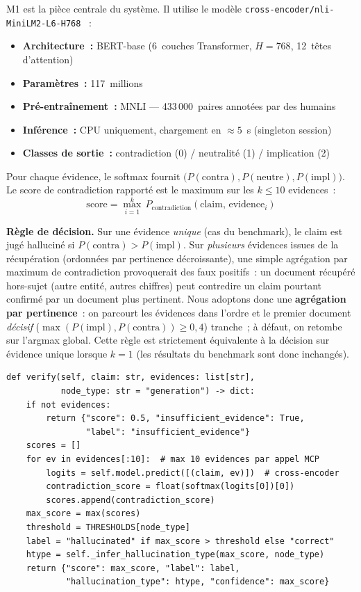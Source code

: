 \documentclass[12pt,a4paper]{article}
\begin{document}
M1 est la pièce centrale du système. Il utilise le modèle \texttt{cross-encoder/nli-MiniLM2-L6-H768} \cite{reimers2019sbert}~:

\begin{itemize}[noitemsep]
  \item \textbf{Architecture~:} BERT-base (6~couches Transformer, $H=768$, 12~têtes d'attention)
  \item \textbf{Paramètres~:} 117~millions
  \item \textbf{Pré-entraînement~:} MNLI \cite{williams2018mnli} --- 433\,000~paires annotées par des humains
  \item \textbf{Inférence~:} CPU uniquement, chargement en $\approx 5$~s (singleton session)
  \item \textbf{Classes de sortie~:} contradiction (0) / neutralité (1) / implication (2)
\end{itemize}

Pour chaque évidence, le softmax fournit $\bigl(P(\text{contra}), P(\text{neutre}), P(\text{impl})\bigr)$. Le score de contradiction rapporté est le maximum sur les $k \leq 10$ evidences~:
\begin{equation}
\text{score} = \max_{i=1}^{k} \,P_{\text{contradiction}}(\text{claim},\,\text{evidence}_i)
\label{eq:max_score}
\end{equation}

\textbf{Règle de décision.} Sur une évidence \emph{unique} (cas du benchmark), le claim est jugé halluciné si $P(\text{contra}) > P(\text{impl})$. Sur \emph{plusieurs} évidences issues de la récupération (ordonnées par pertinence décroissante), une simple agrégation par maximum de contradiction provoquerait des faux positifs~: un document récupéré hors-sujet (autre entité, autres chiffres) peut contredire un claim pourtant confirmé par un document plus pertinent. Nous adoptons donc une \textbf{agrégation par pertinence}~: on parcourt les évidences dans l'ordre et le premier document \emph{décisif} ($\max(P(\text{impl}), P(\text{contra})) \geq 0{,}4$) tranche~; à défaut, on retombe sur l'argmax global. Cette règle est strictement équivalente à la décision sur évidence unique lorsque $k=1$ (les résultats du benchmark sont donc inchangés).

\begin{lstlisting}[caption={Mécanisme de vérification M1}, label={lst:verifier}]
def verify(self, claim: str, evidences: list[str],
           node_type: str = "generation") -> dict:
    if not evidences:
        return {"score": 0.5, "insufficient_evidence": True,
                "label": "insufficient_evidence"}
    scores = []
    for ev in evidences[:10]:  # max 10 evidences par appel MCP
        logits = self.model.predict([(claim, ev)])  # cross-encoder
        contradiction_score = float(softmax(logits[0])[0])
        scores.append(contradiction_score)
    max_score = max(scores)
    threshold = THRESHOLDS[node_type]
    label = "hallucinated" if max_score > threshold else "correct"
    htype = self._infer_hallucination_type(max_score, node_type)
    return {"score": max_score, "label": label,
            "hallucination_type": htype, "confidence": max_score}
\end{lstlisting}
\end{document}
